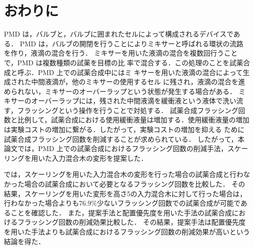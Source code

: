 \chapter{おわりに}
PMD は，バルブと，バルブに囲まれたセルによって構成されるデバイスである．
PMD は，バルブの開閉を行うことによりミキサーと呼ばれる環状の流路を作り，液滴の混合を行う．
ミキサーを用いた液滴の混合を複数回行うことで，PMD は複数種類の試薬を目標の比
率で混合する．この処理のことを試薬合成と呼ぶ．PMD 上での試薬合成中にはミ
キサーを用いた液滴の混合によって生成された中間液滴が，他のミキサーの使用するセル
に残され，液滴の混合を進められない，ミキサーのオーバーラップという状態が発生する場合がある．
ミキサーのオーバーラップには，残された中間液滴を緩衝液という液体で洗い流す，フラッシングという操作を行うことで対処する．
試薬合成フラッシング回数と比例して，試薬合成における使用緩衝液量は増加する．使用緩衝液量の増加は実験コストの増加に繋がる．したがって，実験コストの増加を抑える
ために試薬合成フラッシング回数を削減することが求められている．
したがって，本論文では，PMD 上での試薬合成におけるフラッシング回数の削減手法，スケーリングを用いた入力混合木の変形を提案した．

では，スケーリングを用いた入力混合木の変形を行った場合の試薬合成と行わなかった場合の試薬合成において必要となるフラッシング回数を比較した．
その結果，スケーリングを用いた変形を高さ5の入力混合木に対して行った場合は，行わなかった場合よりも76.9\%少ないフラッシング回数での試薬合成が可能であることを確認した．
また，提案手法と配置優先度を用いた手法の試薬合成におけるフラッシング回数の削減効果比較した．
その結果，提案手法は配置優先度を用いた手法よりも試薬合成におけるフラッシング回数の削減効果が高いという結論を得た．

